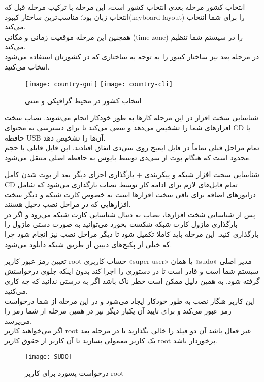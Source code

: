 \begin{frame}{انتخاب کشور}
  مرحله بعدی انتخاب کشور است، این مرحله با ترکیب مرحله قبل که انتخاب زبان بود؛ مناسب‌ترین ساختار کیبود(keyboard layout) را برای شما انتخاب می‌کند.\\
  همچنین این مرحله موقعیت زمانی و مکانی (time zone) را در سیستم شما تنظیم می‌کند.\\
  در مرحله بعد نیز ساختار کیبور را به توجه به ساختاری که در کشورتان استفاده می‌شود انتخاب می‌کنید.
  \begin{figure}
    \texttt{[image: country-gui]}
    \texttt{[image: country-cli]}
    \caption{انتخاب کشور در محیط گرافیکی و متنی~\cite{fig:deb_country_gui}}
  \end{figure}
\end{frame}
\begin{frame}{شناسایی سخت افزار}
  در این مرحله کارها به طور خودکار انجام می‌شوند. نصاب سخت افزارهای شما را تشخیص می‌دهد و سعی می‌کند تا برای دسترسی به محتوای CD یا حافظه USB آن‌ها را تشخیص دهد.\\
تمام مراحل قبلی تماماً در فایل ایمیج روی سی‌دی اتفاق افتادند. این فایل فایلی با حجم محدود است که هنگام بوت از سی‌دی توسط بایوس به حافظه اصلی منتقل می‌شود.
\end{frame}
\begin{frame}{شناسایی سخت افزار شبکه و پیکربندی + بارگذاری اجزای دیگر}
  بعد از بوت شدن کامل CD تمام فایل‌های لازم برای ادامه کار توسط نصاب بارگذاری می‌شود که شامل درایورهای اضافه برای باقی سخت افزارها است به خصوص کارت شبکه و دیگر سخت افزارهایی که در مراحل نصب دخیل هستند.\\
  پس از شناسایی شخت افزارها، نصاب به دنبال شناسایی کارت شبکه می‌رود و اگر در بارگذاری ماژول کارت شبکه شکست بخورد می‌توانید به صورت دستی ماژول را بارگذاری کنید.
  این مرحله باید کاملا تکمیل شود تا دیگر مراحل نصب نیز انجام شود چرا که خیلی از پکیج‌های دبیین از طریق شبکه دانلود می‌شود.
\end{frame}
\begin{frame}{تعیین رمز عبور کاربر root}
  حساب کاربری «super-user» یا همان «sudo» مدیر اصلی سیستم شما است و قادر است تا در دستوری را اجرا کند بدون اینکه جلوی درخواستش گرفته شود. به همین دلیل ممکن است خطر ناک باشد اگر به درستی ندانید که چه کاری می‌کنید.\\
  این کاربر هنگار نصب به طور خودکار ایجاد می‌شود و در این مرحله از شما درخواست رمز عبور می‌کند و برای تایید آن یکبار دیگر نیز در همین مرحله از شما رمز را می‌پرسد.\\
  اگر می‌خواهید کاربر root غیر فعال باشد آن دو فیلد را خالی بگذارید تا در مرحله بعد یک کاربر معمولی بسازید تا آن کاربر از حقوق کاربر root برخوردار باشد.
  \begin{figure}
    \texttt{[image: SUDO]}
    \caption{درخواست پسورد برای کاربر root~\cite{fig:deb_user_root}}
  \end{figure}
\end{frame}
